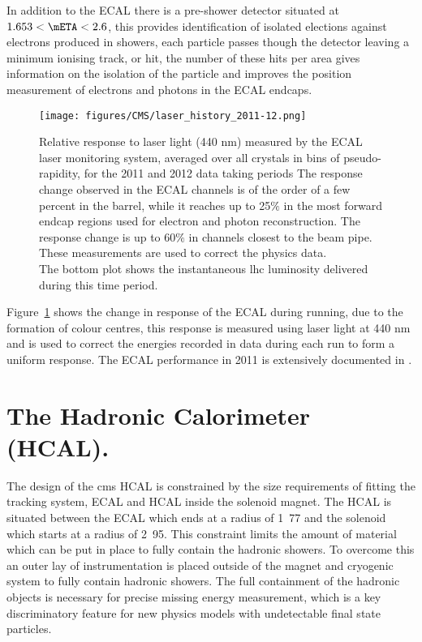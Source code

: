 In addition to the ECAL there is a pre-shower detector situated at $1.653 < 
\mETA < 2.6$, this provides identification of isolated elections against 
electrons produced in showers, each particle passes though the detector leaving 
a minimum ionising track, or hit, the number of these hits per area gives 
information on the isolation of the particle and improves the position 
measurement of electrons and photons in the ECAL endcaps.
\begin{figure}[ht]
  \centering
    \texttt{[image: figures/CMS/laser\_history\_2011-12.png]}
  \caption{Relative response to laser light (440 nm) measured by the ECAL laser 
monitoring system, averaged over all crystals in bins of pseudo-rapidity, for 
the 2011 and 2012 data taking periods 
The response change observed in the ECAL channels is of the order of a few 
percent in the barrel, while it reaches up to 25$\%$ in the most forward endcap 
regions used for electron and photon reconstruction. The response change is up 
to 60$\%$ in channels closest to the beam pipe. These measurements are used to 
correct the physics data. \\ The bottom plot shows the instantaneous \ac{lhc} 
luminosity delivered during this time period.\cite{CMS-DP-2012-015}}
  \label{fig:figures_CMS_laser_history_2011-12}
\end{figure}

Figure~\ref{fig:figures_CMS_laser_history_2011-12} shows the change in response 
of the ECAL during running, due to the formation of colour centres, this 
response is measured using laser light at 440 nm and is used to correct the 
energies recorded in data during each run to form a uniform response.
The ECAL performance in 2011 is extensively documented in \cite{CMS-DP-2012-002}.

\section{The Hadronic Calorimeter (HCAL).} %
\label{sec:the_hadronic_calorimeter}
The design of the \ac{cms} HCAL is constrained by the size requirements of 
fitting the tracking system, ECAL and HCAL inside the solenoid magnet. The HCAL 
is situated between the ECAL which ends at a radius of \unit{1.77}{\meter} and 
the solenoid which starts at a radius of \unit{2.95}{\meter}. This constraint 
limits the amount of material which can be put in place to fully contain the 
hadronic showers. To overcome this an outer lay of instrumentation is placed 
outside of the magnet and cryogenic system to fully contain hadronic showers. 
The full containment of the hadronic objects is necessary for precise missing 
energy measurement, which is a key discriminatory feature for new physics 
models with undetectable final state particles.


